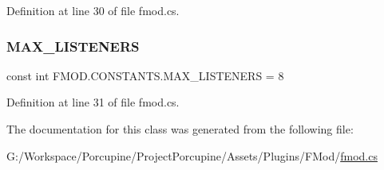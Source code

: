 Definition at line 30 of file fmod.\+cs.

\mbox{\label{class_f_m_o_d_1_1_c_o_n_s_t_a_n_t_s_aab9c79951c81cd83f7cf9aa0eaa5b22b}} 
\subsubsection{\texorpdfstring{M\+A\+X\+\_\+\+L\+I\+S\+T\+E\+N\+E\+RS}{MAX\_LISTENERS}}
{\footnotesize\ttfamily const int F\+M\+O\+D.\+C\+O\+N\+S\+T\+A\+N\+T\+S.\+M\+A\+X\+\_\+\+L\+I\+S\+T\+E\+N\+E\+RS = 8}



Definition at line 31 of file fmod.\+cs.



The documentation for this class was generated from the following file\+:\begin{DoxyCompactItemize}
\item 
G\+:/\+Workspace/\+Porcupine/\+Project\+Porcupine/\+Assets/\+Plugins/\+F\+Mod/\hyperlink{fmod_8cs}{fmod.\+cs}\end{DoxyCompactItemize}
